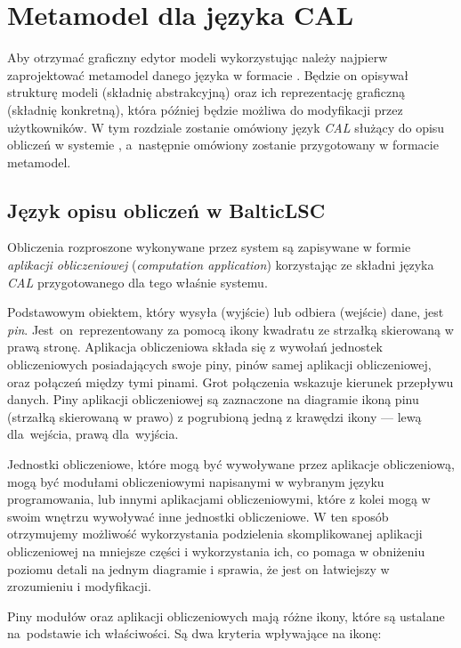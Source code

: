 \chapter{Metamodel dla języka CAL}\label{chapter:cal-metamodel}

Aby otrzymać graficzny edytor modeli wykorzystując \SiriusWeb{} należy
najpierw zaprojektować metamodel danego języka w formacie \Ecore{}. Będzie on
opisywał strukturę modeli (składnię abstrakcyjną) oraz ich
reprezentację graficzną (składnię konkretną), która później będzie możliwa do
modyfikacji przez użytkowników. W tym rozdziale
zostanie omówiony język \emph{\acrfull{CAL}} służący do opisu obliczeń w
systemie \BalticLSC{}, a~następnie omówiony zostanie przygotowany w formacie
\Ecore{} metamodel.

\section{Język opisu obliczeń w BalticLSC}

Obliczenia rozproszone wykonywane przez system \BalticLSC{} są zapisywane w
formie \emph{aplikacji obliczeniowej}
(\emph{computation application})
korzystając ze składni języka \emph{\acrfull{CAL}} przygotowanego dla tego
właśnie systemu.

Podstawowym obiektem, który wysyła (wyjście)
lub odbiera (wejście) dane, jest \emph{pin}. Jest~on~reprezentowany za pomocą
ikony kwadratu ze strzałką skierowaną w prawą stronę. Aplikacja obliczeniowa
składa się z wywołań jednostek obliczeniowych posiadających swoje piny, pinów
samej aplikacji obliczeniowej, oraz połączeń między tymi pinami. Grot
połączenia wskazuje kierunek przepływu danych.
Piny aplikacji obliczeniowej są zaznaczone na
diagramie ikoną pinu (strzałką skierowaną w prawo) z pogrubioną
jedną z krawędzi ikony --- lewą dla~wejścia, prawą dla~wyjścia.

Jednostki obliczeniowe, które mogą być wywoływane przez aplikacje obliczeniową,
mogą być modułami obliczeniowymi napisanymi w wybranym języku programowania,
lub innymi aplikacjami obliczeniowymi, które z kolei mogą w swoim wnętrzu
wywoływać inne jednostki obliczeniowe. W ten sposób otrzymujemy możliwość
wykorzystania podzielenia skomplikowanej aplikacji obliczeniowej na mniejsze
części i wykorzystania ich, co pomaga w obniżeniu poziomu detali na jednym
diagramie i sprawia, że jest on łatwiejszy w zrozumieniu i modyfikacji.

Piny modułów oraz aplikacji obliczeniowych mają różne ikony, które
są ustalane na~podstawie ich właściwości. Są dwa kryteria wpływające na ikonę:

